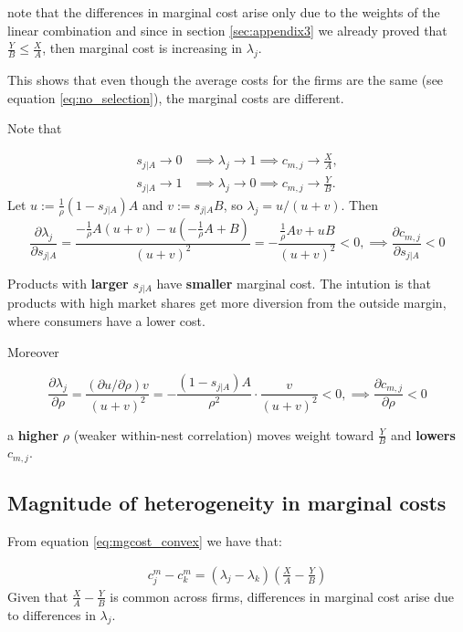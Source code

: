\documentclass[12pt]{article}
\theoremstyle{plain}
\theoremstyle{plain}
\begin{document}
note that the differences in marginal cost arise only due to the weights of the linear combination and since  in section \ref{sec:appendix3} we already proved that $ \frac{Y}{B} \leq \frac{X}{A}$, then marginal cost is increasing in  $\lambda_j$. 

This shows that even though the average costs for the firms are the same (see equation \ref{eq:no_selection}), the marginal costs are different. 

Note that 

\begin{align*}
s_{j|A} \to 0 &\implies \lambda_j \to 1 \implies c_{m,j} \to \frac{X}{A}, \\
s_{j|A} \to 1 &\implies \lambda_j \to 0 \implies c_{m,j} \to \frac{Y}{B}.
\end{align*}
Let $u := \frac{1}{\rho}(1-s_{j|A})A$ and $v := s_{j|A}B$, so $\lambda_j = u/(u+v)$. Then
\[
\frac{\partial \lambda_j}{\partial s_{j|A}} = \frac{-\frac{1}{\rho}A(u+v) - u(-\frac{1}{\rho}A+B)}{(u+v)^2} = -\frac{\frac{1}{\rho}Av + uB}{(u+v)^2} < 0, \implies  \frac{\partial c_{m,j}}{\partial s_{j|A}} < 0
\]

Products with \textbf{larger} $s_{j|A}$ have \textbf{smaller} marginal cost. The intution is that products with high market shares get more diversion from the outside margin, where consumers have a lower cost. 

Moreover 
 
\[
\frac{\partial \lambda_j}{\partial \rho} = \frac{(\partial u / \partial \rho)v}{(u+v)^2} = -\frac{(1-s_{j|A})A}{\rho^2} \cdot \frac{v}{(u+v)^2} < 0, \implies  \frac{\partial c_{m,j}}{\partial \rho} < 0 
\]


a \textbf{higher} $\rho$ (weaker within-nest correlation) moves weight toward $\frac{Y}{B}$ and \textbf{lowers} $c_{m,j}$.


   
 

\bigskip

\newpage
\subsection{Magnitude of heterogeneity in marginal costs}

From equation \ref{eq:mgcost_convex} we have that: 

 \begin{align} 
    c^m_j -c^m_k = (\lambda_j - \lambda_k)\left(\frac{X}{A}-\frac{Y}{B}\right)
\end{align}
Given that $\frac{X}{A}-\frac{Y}{B}$ is common across firms, differences in marginal cost arise due to differences in $\lambda_j$. 
\end{document}
